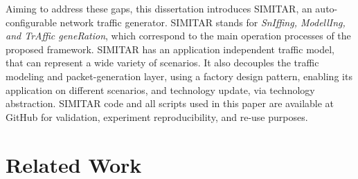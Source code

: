 Aiming to address these gaps, this dissertation introduces \acrfull{SIMITAR}, an auto-configurable network traffic generator. SIMITAR stands for \textit{SnIffing, ModellIng, and TrAffic geneRation}, which correspond to the main operation processes of the proposed framework.  SIMITAR has an application independent traffic model, that can represent a wide variety of scenarios. It also decouples the traffic modeling and packet-generation layer, using a factory design pattern, enabling its application on different scenarios, and technology update, via technology abstraction.  SIMITAR code and all scripts used in this paper are available at GitHub\cite{projeto-github} for validation, experiment reproducibility, and re-use purposes. 


\section{Related Work}


\begin{table}[ht!]
    \centering
    \caption{Comparison of existing traffic generation tools.}
    \label{tab:related-work}
\end{table}



